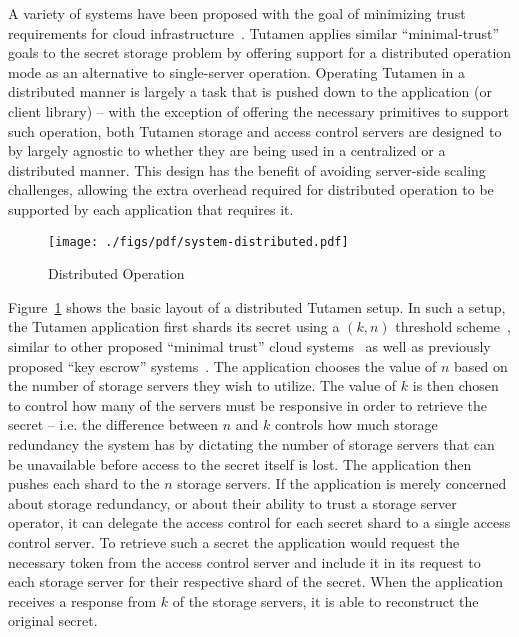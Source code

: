 A variety of systems have been proposed with the goal of minimizing
trust requirements for cloud infrastructure~\cite{bessani2011,
  kallahalla2003, kubiatowicz2000, mahajan2011,
  wilcox-o'hearn2008}. Tutamen applies similar ``minimal-trust'' goals
to the secret storage problem by offering support for a distributed
operation mode as an alternative to single-server operation. Operating
Tutamen in a distributed manner is largely a task that is pushed down
to the application (or client library) -- with the exception of
offering the necessary primitives to support such operation, both
Tutamen storage and access control servers are designed to by largely
agnostic to whether they are being used in a centralized or a
distributed manner. This design has the benefit of avoiding
server-side scaling challenges, allowing the extra overhead required
for distributed operation to be supported by each application that
requires it.

\begin{figure}[th]
  \centering
  \texttt{[image: ./figs/pdf/system-distributed.pdf]}
  \caption{Distributed Operation}
  \label{fig:tutamen:systemdistributed}
\end{figure}

Figure~\ref{fig:tutamen:systemdistributed} shows the basic layout of a
distributed Tutamen setup. In such a setup, the Tutamen application
first shards its secret using a $(k, n)$ threshold
scheme~\cite{shamir1979, krawczyk1993}, similar to other proposed
``minimal trust'' cloud systems~\cite{bessani2011} as well as
previously proposed ``key escrow'' systems~\cite{blaze1996,
  denning1996}. The application chooses the value of $n$ based on the
number of storage servers they wish to utilize. The value of $k$ is
then chosen to control how many of the servers must be responsive in
order to retrieve the secret -- i.e. the difference between $n$ and
$k$ controls how much storage redundancy the system has by dictating
the number of storage servers that can be unavailable before access to
the secret itself is lost. The application then pushes each shard to
the $n$ storage servers. If the application is merely concerned about
storage redundancy, or about their ability to trust a storage server
operator, it can delegate the access control for each secret shard to
a single access control server. To retrieve such a secret the
application would request the necessary token from the access control
server and include it in its request to each storage server for their
respective shard of the secret. When the application receives a
response from $k$ of the storage servers, it is able to reconstruct
the original secret.

